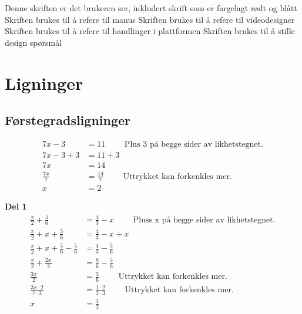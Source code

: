 \documentclass[12pt,twoside,onecolumn]{article}
\begin{document}
\hspace{-6mm}Denne skriften er det brukeren ser, inkludert skrift som er fargelagt {\color{red}rødt} og {\color{blue}blått}\newline
{\color{gray} Skriften brukes til å refere til manus} \newline
{\color{PineGreen} Skriften brukes til å refere til videodesigner} \newline
{\color{Maroon} Skriften brukes til å refere til handlinger i plattformen} \newline
{\color{Cerulean} Skriften brukes til å stille design spørsmål}

\section*{Ligninger}

\subsection*{Førstegradsligninger}

\begin{Exercise}
\begin{align}
7x - 3 &= 11  \qquad\text{ Plus 3 på begge sider av likhetstegnet.}\\
7x -3 +3 &= 11 + 3\\
7x &= 14\\  
\frac{7x}{7} &=  \frac{14}{7} \qquad\text{ Uttrykket kan forkenkles mer.}\\
x &= 2
\end{align}
\end{Exercise}

\begin{Exercise}
\textbf{Del 1}
\begin{align}
\frac{x}{2} + \frac{5}{6} &=  \frac{4}{3} - x \qquad\text{ Pluss x på begge sider av likhetstegnet.}\\
\frac{x}{2} + x + \frac{5}{6} &=  \frac{4}{3} - x + x\\
\frac{x}{2} + x + \frac{5}{6} - \frac{5}{6} &=  \frac{4}{3} - \frac{5}{6}\\
\frac{x}{2} + \frac{2x}{2} &= \frac{8}{6} - \frac{5}{6}\\
\frac{3x}{2}  &= \frac{3}{6} \qquad\text{ Uttrykket kan forkenkles mer.}\\ 
\frac{3x\cdot2}{7\cdot3} &=  \frac{1\cdot2}{2\cdot3} \qquad\text{ Uttrykket kan forkenkles mer.}\\
x &= \frac{1}{2}
\end{align}
\end{Exercise}
\end{document}
